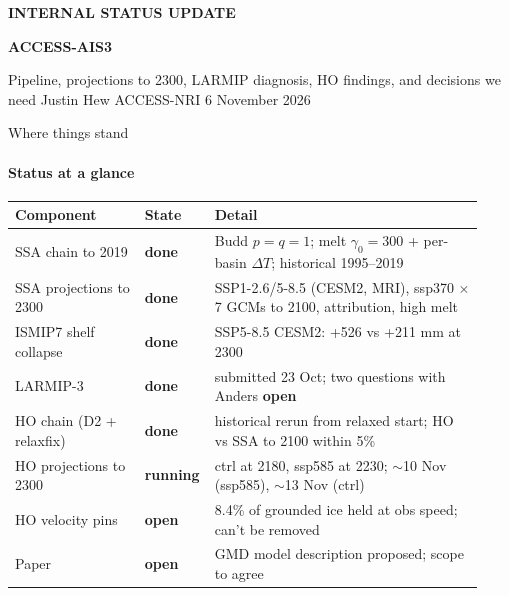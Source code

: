 \documentclass[aspectratio=169,10pt]{beamer}
\makeatletter
\newcommand{\serif}{\fontfamily{qpl}\selectfont}
\newcommand{\source}[1]{\gdef\beamer@shortsource{#1}}
\gdef\beamer@shortsource{}
\newcommand{\nosource}{\source{}}
\newcommand{\done}{{\bfseries\color{green}done}}
\newcommand{\running}{{\bfseries\color{blue}running}}
\newcommand{\open}{{\bfseries\color{accent}open}}
\makeatother
\begin{document}
{
\begin{frame}
\vfill
{\scriptsize\bfseries\color{sand}INTERNAL \textperiodcentered{} STATUS UPDATE}\par\vspace{4mm}
{\serif\fontsize{36}{40}\selectfont\bfseries\color{cream}ACCESS-AIS3}\par\vspace{4mm}
{\large\color{mist}Pipeline, projections to 2300, LARMIP diagnosis, HO findings, and decisions we need}
\vfill
{\small\color{mist}Justin Hew \textperiodcentered{} ACCESS-NRI \textperiodcentered{} 6 November 2026}
\vspace{6mm}
\end{frame}}

\nosource
\begin{frame}{Where things stand}
\framesubtitle{Status at a glance}
\vspace{1mm}\footnotesize
\begin{tabular}{@{}p{0.27\linewidth}p{0.1\linewidth}p{0.56\linewidth}@{}}
\toprule
\textbf{Component} & \textbf{State} & \textbf{Detail}\\
\midrule
SSA chain to 2019 & \done & Budd $p=q=1$; melt $\gamma_0=300$ + per-basin $\Delta T$; historical 1995--2019\\
SSA projections to 2300 & \done & SSP1-2.6/5-8.5 (CESM2, MRI), ssp370 $\times$7 GCMs to 2100, attribution, high melt\\
ISMIP7 shelf collapse & \done & SSP5-8.5 CESM2: +526 vs +211 mm at 2300\\
LARMIP-3 & \done & submitted 23 Oct; two questions with Anders \open\\
HO chain (D2 + relaxfix) & \done & historical rerun from relaxed start; HO vs SSA to 2100 within 5\%\\
HO projections to 2300 & \running & ctrl at 2180, ssp585 at 2230; $\sim$10 Nov (ssp585), $\sim$13 Nov (ctrl)\\
HO velocity pins & \open & 8.4\% of grounded ice held at obs speed; can't be removed\\
Paper & \open & GMD model description proposed; scope to agree\\
\bottomrule
\end{tabular}
\end{frame}
\end{document}
